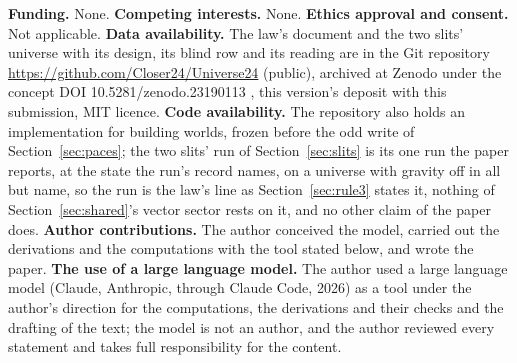 \documentclass[pdflatex,sn-mathphys-num]{sn-jnl}
\theoremstyle{thmstyleone}
\theoremstyle{thmstyletwo}
\begin{document}
\noindent\textbf{Funding.} None. \textbf{Competing interests.} None. \textbf{Ethics approval and consent.} Not applicable. \textbf{Data availability.} The law's document and the two slits' universe with its design, its blind row and its reading are in the Git repository \url{https://github.com/Closer24/Universe24} (public), archived at Zenodo under the concept DOI 10.5281/zenodo.23190113 \cite{zenodo}, this version's deposit with this submission, MIT licence. \textbf{Code availability.} The repository also holds an implementation for building worlds, frozen before the odd write of Section~\ref{sec:paces}; the two slits' run of Section~\ref{sec:slits} is its one run the paper reports, at the state the run's record names, on a universe with gravity off in all but name, so the run is the law's line as Section~\ref{sec:rule3} states it, nothing of Section~\ref{sec:shared}'s vector sector rests on it, and no other claim of the paper does. \textbf{Author contributions.} The author conceived the model, carried out the derivations and the computations with the tool stated below, and wrote the paper. \textbf{The use of a large language model.} The author used a large language model (Claude, Anthropic, through Claude Code, 2026) as a tool under the author's direction for the computations, the derivations and their checks and the drafting of the text; the model is not an author, and the author reviewed every statement and takes full responsibility for the content.
\vspace{-6pt}
\end{document}

